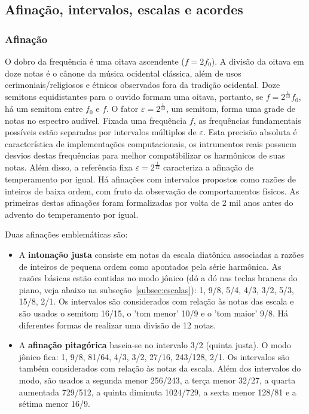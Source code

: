 \subsection{Afinação, intervalos, escalas e acordes}\label{subsec:afinacao}
\subsubsection{Afinação}
O dobro da frequência é uma oitava ascendente ($f=2f_0$).
A divisão da oitava em doze notas é o cânone da música ocidental clássica,
além de usos cerimoniais/religiosos e étnicos observados fora da tradição ocidental.\cite{Wisnick}
Doze semitons equidistantes para o ouvido formam uma oitava,
portanto, se $f=2^{\frac{1}{12}}f_0$, há um semitom entre $f_0$
e $f$.
O fator $\varepsilon=2^{\frac{1}{12}}$, um semitom, forma uma grade de notas
no espectro audível. Fixada uma frequência $f$, as frequências fundamentais possíveis
estão separadas por intervalos múltiplos de $\varepsilon$.
Esta precisão absoluta é característica de implementações
computacionais, os intrumentos reais possuem desvios destas frequências para melhor compatibilizar os harmônicos
de suas notas. Além disso, a referência fixa $\varepsilon=2^{\frac{1}{12}}$ caracteriza
a afinação de temperamento por igual. Há afinações com intervalos propostos como razões de inteiros de baixa ordem, com
fruto da observação de comportamentos físicos.  As primeiras destas afinações foram formalizadas por volta de 2 mil anos antes do advento do temperamento por igual.\cite{Roederer}

Duas afinações emblemáticas são:
\begin{itemize}
    \item A {\bf intonação justa} consiste em notas da escala diatônica associadas a razões de inteiros de pequena ordem como apontados pela série harmônica. As razões básicas estão contidas no modo jônico (dó a dó nas teclas brancas do piano, veja abaixo na subseção~\ref{subsec:escalas}): 1, 9/8, 5/4, 4/3, 3/2, 5/3, 15/8, 2/1. Os intervalos são considerados com relação às notas das escala e são usados o semitom 16/15, o 'tom menor' 10/9 e o 'tom maior' 9/8. Há diferentes formas de realizar uma divisão de 12 notas.
    \item A {\bf afinação pitagórica} baseia-se no intervalo 3/2 (quinta justa). O modo jônico fica: 1, 9/8, 81/64, 4/3, 3/2, 27/16, 243/128, 2/1. Os intervalos são também considerados com relação às notas da escala. Além dos intervalos do modo, são usados a segunda menor 256/243, a terça menor 32/27, a quarta aumentada 729/512, a quinta diminuta 1024/729, a sexta menor 128/81 e a sétima menor 16/9. 
\end{itemize}


